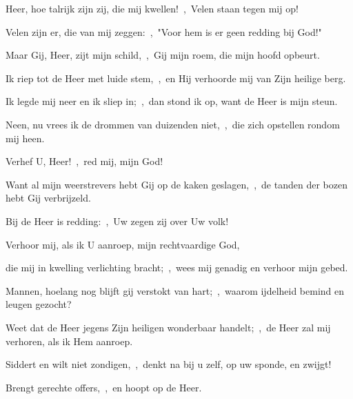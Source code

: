 \documentclass[12pt,twoside,a5paper]{article}
\begin{document}


\begin{halfparskip}
  Heer, hoe talrijk zijn zij, die mij kwellen!~\sep\ Velen staan tegen mij op!


  Velen zijn er, die van mij zeggen:~\sep\ "Voor hem is er geen redding bij God!"

  Maar Gij, Heer, zijt mijn schild,~\sep\ Gij mijn roem, die mijn hoofd opbeurt.
\end{halfparskip}


\begin{halfparskip}
  Ik riep tot de Heer met luide stem,~\sep\ en Hij verhoorde mij van Zijn heilige berg.

  Ik legde mij neer en ik sliep in;~\sep\ dan stond ik op, want de Heer is mijn steun.

  Neen, nu vrees ik de drommen van duizenden niet,~\sep\ die zich opstellen rondom mij heen.

  Verhef U, Heer!~\sep\ red mij, mijn God!

  Want al mijn weerstrevers hebt Gij op de kaken geslagen,~\sep\ de tanden der bozen hebt Gij verbrijzeld.

Bij de Heer is redding:~\sep\ Uw zegen zij over Uw volk!
\end{halfparskip}


\begin{halfparskip}
  Verhoor mij, als ik U aanroep, mijn rechtvaardige God,


  die mij in kwelling verlichting bracht;~\sep\ wees mij genadig en verhoor mijn gebed.
\end{halfparskip}


\begin{halfparskip}
  Mannen, hoelang nog blijft gij verstokt van hart;~\sep\ waarom ijdelheid bemind en leugen gezocht?

  Weet dat de Heer jegens Zijn heiligen wonderbaar handelt;~\sep\ de Heer zal mij verhoren, als ik Hem aanroep.

  Siddert en wilt niet zondigen,~\sep\ denkt na bij u zelf, op uw sponde, en zwijgt!

  Brengt gerechte offers,~\sep\ en hoopt op de Heer.
\end{halfparskip}
\end{document}
